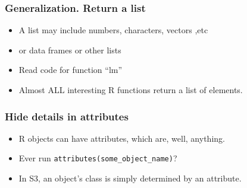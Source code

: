 \documentclass[11pt,english]{beamer}
\begin{document}

\begin{frame}[containsverbatim]
  \frametitle{Generalization. Return a list}
  \begin{itemize}

  \item A list may include numbers, characters, vectors ,etc
  \item or data frames or other lists
  \item Read code for function ``lm''
  \item Almost ALL interesting R functions return a list of elements.
  \end{itemize}
\end{frame}


\begin{frame}
  \frametitle{Hide details in attributes}
  \begin{itemize}
    \item R objects can have attributes, which are, well, anything.
      
    \item Ever run \texttt{attributes(some\_object\_name)}?
      
    \item In S3, an object's class is simply determined by an attribute.
  \end{itemize}
  

    
 
\end{frame}





\end{document}

